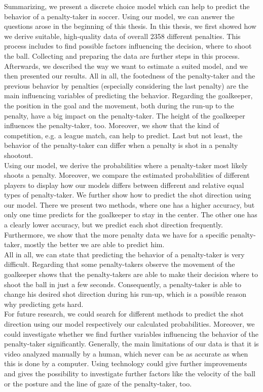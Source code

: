 \documentclass[12pt,dvipsnames]{article}%
\begin{document}
Summarizing, we present a discrete choice model which can help to predict the behavior of a penalty-taker in soccer. Using our model, we can answer the questions arose in the beginning of this thesis. In this thesis, we first showed how we derive suitable, high-quality data of overall 2358 different penalties. This process includes to find possible factors influencing the decision, where to shoot the ball. Collecting and preparing the data are further steps in this process. \\
Afterwards, we described the way we want to estimate a suited model, and we then presented our results. All in all, the footedness of the penalty-taker and the previous behavior by penalties (especially considering the last penalty) are the main influencing variables of predicting the behavior. Regarding the goalkeeper, the position in the goal and the movement, both during the run-up to the penalty, have a big impact on the penalty-taker. The height of the goalkeeper influences the penalty-taker, too. Moreover, we show that the kind of competition, e.g. a league match, can help to predict. Last but not least, the behavior of the penalty-taker can differ when a penalty is shot in a penalty shootout.  \\
Using our model, we derive the probabilities where a penalty-taker most likely shoots a penalty. Moreover, we compare the estimated probabilities of different players to display how our models differs between different and relative equal types of penalty-taker. We further show how to predict the shot direction using our model. There we present two methods, where one has a higher accuracy, but only one time predicts for the goalkeeper to stay in the center. The other one has a clearly lower accuracy, but we predict each shot direction frequently. Furthermore, we show that the more penalty data we have for a specific penalty-taker, mostly the better we are able to predict him. \\
All in all, we can state that predicting the behavior of a penalty-taker is very difficult. Regarding that some penalty-takers observe the movement of the goalkeeper shows that the penalty-takers are able to make their decision where to shoot the ball in just a few seconds. Consequently, a penalty-taker is able to change his desired shot direction during his run-up, which is a possible reason why predicting gets hard. \\
For future research, we could search for different methods to predict the shot direction using our model respectively our calculated probabilities. Moreover, we could investigate whether we find further variables influencing the behavior of the penalty-taker significantly. Generally, the main limitations of our data is that it is video analyzed manually by a human, which never can be as accurate as when this is done by a computer. Using technology could give further improvements and gives the possibility to investigate further factors like the velocity of the ball or the posture and the line of gaze of the penalty-taker, too. \\
\end{document}
